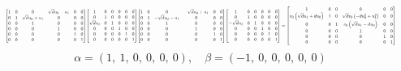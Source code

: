 \documentclass[11pt]{article}
\theoremstyle{definition}
\begin{document}
\[
\scaletoalign{\textwidth}{{\left[\begin{matrix}1 & 0 & 0 & \sqrt{d} u_{0} - u_{1} & 0 & 0\\0 & 1 & \sqrt{d} u_{0} + u_{1} & 0 & 0 & 0\\0 & 0 & 1 & 0 & 0 & 0\\0 & 0 & 0 & 1 & 0 & 0\\0 & 0 & 0 & 0 & 1 & 0\\0 & 0 & 0 & 0 & 0 & 1\end{matrix}\right]} {\left[\begin{matrix}1 & 0 & 0 & 0 & 0 & 0\\0 & 1 & 0 & 0 & 0 & 0\\\sqrt{d} v_{0} & 0 & 1 & 0 & 0 & 0\\0 & 0 & 0 & 1 & 0 & 0\\0 & 0 & 0 & 0 & 1 & 0\\0 & 0 & 0 & 0 & 0 & 1\end{matrix}\right]} {\left[\begin{matrix}1 & 0 & 0 & - \sqrt{d} u_{0} + u_{1} & 0 & 0\\0 & 1 & - \sqrt{d} u_{0} - u_{1} & 0 & 0 & 0\\0 & 0 & 1 & 0 & 0 & 0\\0 & 0 & 0 & 1 & 0 & 0\\0 & 0 & 0 & 0 & 1 & 0\\0 & 0 & 0 & 0 & 0 & 1\end{matrix}\right]} {\left[\begin{matrix}1 & 0 & 0 & 0 & 0 & 0\\0 & 1 & 0 & 0 & 0 & 0\\- \sqrt{d} v_{0} & 0 & 1 & 0 & 0 & 0\\0 & 0 & 0 & 1 & 0 & 0\\0 & 0 & 0 & 0 & 1 & 0\\0 & 0 & 0 & 0 & 0 & 1\end{matrix}\right]} = {\left[\begin{matrix}1 & 0 & 0 & 0 & 0 & 0\\v_{0} \left(\sqrt{d} u_{1} + d u_{0}\right) & 1 & 0 & \sqrt{d} v_{0} \left(- d u_{0}^{2} + u_{1}^{2}\right) & 0 & 0\\0 & 0 & 1 & v_{0} \left(\sqrt{d} u_{1} - d u_{0}\right) & 0 & 0\\0 & 0 & 0 & 1 & 0 & 0\\0 & 0 & 0 & 0 & 1 & 0\\0 & 0 & 0 & 0 & 0 & 1\end{matrix}\right]}}
\]
\[
\alpha = \left( 1, \  1, \  0, \  0, \  0, \  0\right), \quad \beta = \left( -1, \  0, \  0, \  0, \  0, \  0\right)
\]
\end{document}
